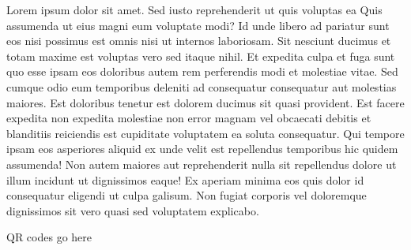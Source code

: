 \documentclass{article}%
\begin{document}
\vspace*{8pt}%
\linebreak%
\newline%
\newline%
    Lorem ipsum dolor sit amet. Sed iusto reprehenderit ut quis voluptas ea Quis assumenda ut eius magni eum voluptate modi? Id unde libero ad pariatur sunt eos nisi possimus est omnis nisi ut internos laboriosam. Sit nesciunt ducimus et totam maxime est voluptas vero sed itaque nihil. Et expedita culpa et fuga sunt quo esse ipsam eos doloribus autem rem perferendis modi et molestiae vitae.\newline%
\newline%
    Sed cumque odio eum temporibus deleniti ad consequatur consequatur aut molestias maiores. Est doloribus tenetur est dolorem ducimus sit quasi provident. Est facere expedita non expedita molestiae non error magnam vel obcaecati debitis et blanditiis reiciendis est cupiditate voluptatem ea soluta consequatur. Qui tempore ipsam eos asperiores aliquid ex unde velit est repellendus temporibus hic quidem assumenda!\newline%
\newline%
    Non autem maiores aut reprehenderit nulla sit repellendus dolore ut illum incidunt ut dignissimos eaque! Ex aperiam minima eos quis dolor id consequatur eligendi ut culpa galisum. Non fugiat corporis vel doloremque dignissimos sit vero quasi sed voluptatem explicabo.\newline%
\newline%
\vspace*{30pt}%
\begin{center}%
\begin{Huge}%
QR codes go here%
\end{Huge}%
\end{center}%
\newpage%
\end{document}
